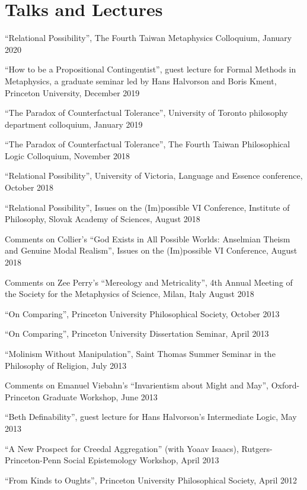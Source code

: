 \documentclass{cv_07152020}
\begin{document}
\section*{Talks and Lectures}
\medskip
\begin{etaremune}
	\item ``Relational Possibility'', The Fourth Taiwan Metaphysics Colloquium, January 2020
	\item ``How to be a Propositional Contingentist'', guest lecture for Formal Methods in Metaphysics, a graduate seminar led by Hans Halvorson and Boris Kment, Princeton University, December 2019
	\item ``The Paradox of Counterfactual Tolerance'', University of Toronto philosophy department colloquium, January  2019 %
	\item ``The Paradox of Counterfactual Tolerance'', The Fourth Taiwan Philosophical Logic Colloquium, November 2018
	\item ``Relational Possibility'', University of Victoria, Language and Essence conference, October 2018
	\item ``Relational Possibility'', Issues on the (Im)possible VI Conference, Institute of Philosophy, Slovak Academy of Sciences, August 2018
	\item Comments on Collier's ``God Exists in All Possible Worlds: Anselmian Theism and Genuine Modal Realism'', Issues on the (Im)possible VI Conference, August 2018
	\item Comments on Zee Perry's ``Mereology and Metricality'', 4th Annual Meeting of the Society for the Metaphysics of Science, Milan, Italy August 2018
	\item ``On Comparing'', Princeton University Philosophical Society, October 2013
	\item ``On Comparing'', Princeton University Dissertation Seminar, April 2013
	\item ``Molinism Without Manipulation'', Saint Thomas Summer Seminar in the Philosophy of Religion, July 2013
	\item Comments on Emanuel Viebahn's ``Invarientism about Might and May'', Oxford-Princeton Graduate Workshop, June 2013
	\item ``Beth Definability'', guest lecture for Hans Halvorson's Intermediate Logic, May 2013	
	\item ``A New Prospect for Creedal Aggregation'' (with Yoaav Isaacs), Rutgers-Princeton-Penn Social Epistemology Workshop, April 2013
	\item ``From Kinds to Oughts'', Princeton University Philosophical Society, April 2012

\end{etaremune}
\end{document}
